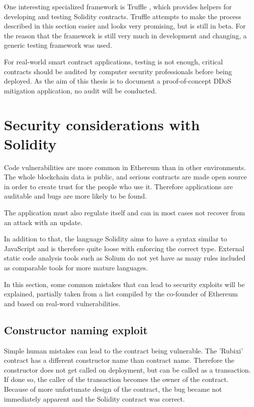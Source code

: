 One interesting specialized framework is Truffle \cite{Truffle}, which provides helpers for developing and testing Solidity contracts. Truffle attempts to make the process described in this section easier and looks very promising, but is still in beta. For the reason that the framework is still very much in development and changing, a generic testing framework was used.

For real-world smart contract applications, testing is not enough, critical contracts should be audited by computer security professionals before being deployed. As the aim of this thesis is to document a proof-of-concept DDoS mitigation application, no audit will be conducted.

\section{Security considerations with Solidity}
Code vulnerabilities are more common in Ethereum than in other environments. The whole blockchain data is public, and serious contracts are made open source in order to create trust for the people who use it. Therefore applications are auditable and bugs are more likely to be found.

The application must also regulate itself and can in most cases not recover from an attack with an update.

In addition to that, the language Solidity aims to have a syntax similar to JavaScript and is therefore quite loose with enforcing the correct type. External static code analysis tools such as Solium \cite{Solium} do not yet have as many rules included as comparable tools for more mature languages.

In this section, some common mistakes that can lead to security exploits will be explained, partially taken from a list compiled by the co-founder of Ethereum \cite{ThinkingAboutSmartContractSecurity} and based on real-word vulnerabilities.

\subsection{Constructor naming exploit}
Simple human mistakes can lead to the contract being vulnerable. The 'Rubixi' contract has a different constructor name than contract name. Therefore the constructor does not get called on deployment, but can be called as a transaction. If done so, the caller of the transaction becomes the owner of the contract. Because of more unfortunate design of the contract, the bug became not immediately apparent and the Solidity contract was correct.

